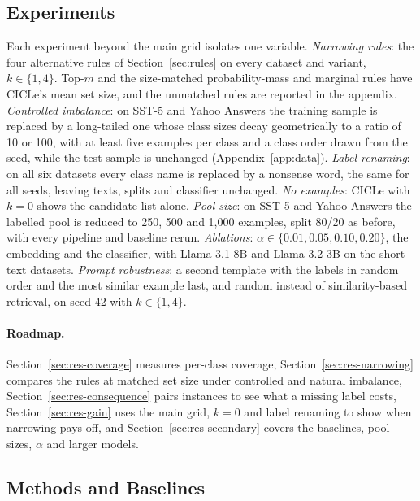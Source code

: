 \subsection{Experiments}
\label{sec:experiments}

Each experiment beyond the main grid isolates one variable.
\emph{Narrowing rules}: the four alternative rules of Section~\ref{sec:rules} on every dataset and variant, $k \in \{1, 4\}$. Top-$m$ and the size-matched probability-mass and marginal rules have CICLe's mean set size, and the unmatched rules are reported in the appendix. %
\emph{Controlled imbalance}: on SST-5 and Yahoo Answers the training sample is replaced by a long-tailed one whose class sizes decay geometrically to a ratio of 10 or 100, with at least five examples per class and a class order drawn from the seed, while the test sample is unchanged (Appendix~\ref{app:data}).
\emph{Label renaming}: on all six datasets every class name is replaced by a nonsense word, the same for all seeds, leaving texts, splits and classifier unchanged.
\emph{No examples}: CICLe with $k = 0$ shows the candidate list alone.
\emph{Pool size}: on SST-5 and Yahoo Answers the labelled pool is reduced to 250, 500 and 1,000 examples, split 80/20 as before, with every pipeline and baseline rerun.
\emph{Ablations}: $\alpha \in \{0.01, 0.05, 0.10, 0.20\}$, the embedding and the classifier, with Llama-3.1-8B and Llama-3.2-3B on the short-text datasets. %
\emph{Prompt robustness}: a second template with the labels in random order and the most similar example last, and random instead of similarity-based retrieval, on seed 42 with $k \in \{1, 4\}$. %

\paragraph{Roadmap.}
Section~\ref{sec:res-coverage} measures per-class coverage, Section~\ref{sec:res-narrowing} compares the rules at matched set size under controlled and natural imbalance, Section~\ref{sec:res-consequence} pairs instances to see what a missing label costs, Section~\ref{sec:res-gain} uses the main grid, $k = 0$ and label renaming to show when narrowing pays off, and Section~\ref{sec:res-secondary} covers the baselines, pool sizes, $\alpha$ and larger models.

\subsection{Methods and Baselines}
\label{sec:methods}

